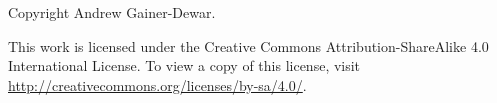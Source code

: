 \documentclass[../book/calcnotes.tex]{subfiles}
\begin{document}
\thispagestyle{empty}


\noindent
Copyright  Andrew Gainer-Dewar.

\vspace*{1cm}

\noindent
This work is licensed under the Creative Commons Attribution-ShareAlike 4.0 International License.
To view a copy of this license, visit \url{http://creativecommons.org/licenses/by-sa/4.0/}.
\end{document}
